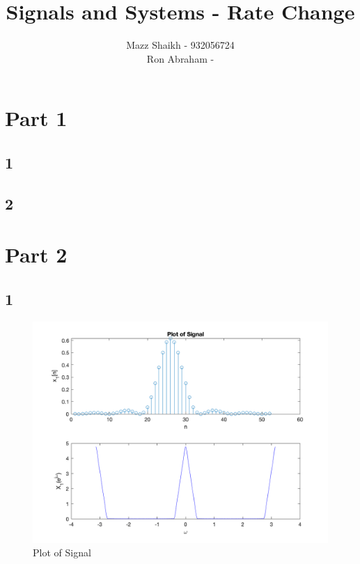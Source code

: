 \documentclass{article}
\title{Signals and Systems - Rate Change}
\author{Mazz Shaikh - 932056724\\ Ron Abraham - }
\begin{document}
\maketitle

\section*{Part 1}
\subsection*{1}
\subsection*{2}

\newpage

\section*{Part 2}

\subsection*{1}

\begin{figure}[H]
    \centering
    \includegraphics[scale=0.4]{Plot of Signal.png}
    \caption{Plot of Signal}
    \label{Plot of Signal}
\end{figure}
\end{document}

